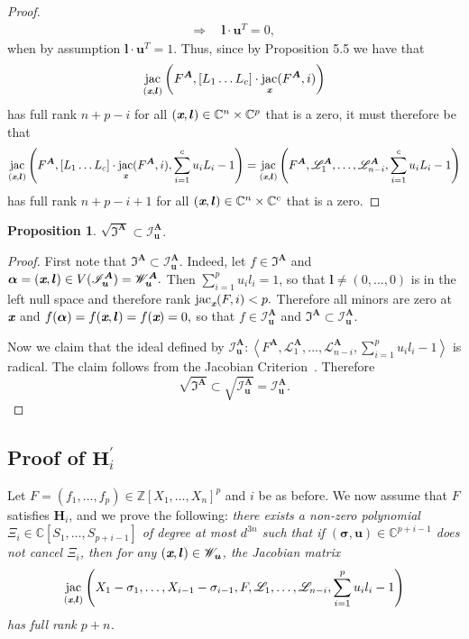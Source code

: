 \documentclass[a4paper]{article}
\def\sL{\mathscr{L}}
\def\sLA{\mathscr{L}^{\mA}}
\def\mA{{\bm A}}
\def\ub{{\bm u}}
\def\lb{{\bm l}}
\def\xb{\textit{\textbf{x}}}
\DeclareMathOperator{\jac}{jac}
\newcommand{\ZZ}{{\mathbb{Z}}}
\def\C{\mathbb{C}}
\def\IA{\mathfrak{I}^{\mA}}
\def\IAr{\sqrt{\mathfrak{I}^{\mA}}}
\def\IlA{\mathscr{I}_{\ub}^{\mA}}
\def\Wl{\mathscr{W}_{\ub}}
\def\WlA{\mathscr{W}_{\ub}^{\mA}}
\def\udl{\sum_{i=1}^pu_il_i}
\newtheorem{prop}[theorem]{Proposition}
\begin{document}
\begin{proof}
\begin{align*}
        \Rightarrow
        ~&~\lb \cdot \ub^T = 0,
    \end{align*}
    when by assumption $\lb \cdot \ub^T = 1.$ Thus, since by Proposition 5.5 we have that
    \[
   \jac_{(\xb,\lb)} \left(F^{\mA},[L_1 \hdots L_c] \cdot \jac_{\xb} (F^{\mA}, i)\right)
    \]
    has full rank $n+p-i$ for all $(\xb, \bm l) \in \C^n \times \C^p$ that is a zero, it must therefore be that 
    \[
    \jac_{(\xb,\lb)} \left(F^{\mA},[L_1 \hdots L_c] \cdot \jac_{\xb} (F^{\mA}, i),\sum_{i=1}^c u_iL_i-1\right)
    =
        \jac_{(\xb,\lb)} \left(F^{\mA},\sLA_1,\hdots,\sLA_{n-i},\sum_{i=1}^c u_iL_i-1\right)
    \]
    has full rank $n+p-i+1$ for all $(\xb, \bm l) \in \C^n \times \C^c$ that is a zero.
    \end{proof}
    \begin{prop}
    $
    \IAr \subset \IlA. 
    $
    \end{prop}
    \begin{proof}
    First note that $\IA \subset \IlA.$ Indeed, let $f \in \IA$ and $\bm \alpha = (\xb,\lb) \in V(\IlA)=\WlA.$ Then $\sum_{i=1}^p u_i l_i = 1$, so that $\lb \not = (0,\hdots,0)$ is in the left null space and therefore rank $\jac_{\xb} (F,i) < p.$ Therefore all minors are zero at $\xb$ and $f(\bm \alpha)= f(\xb,\lb)=f(\xb)=0,$ so that $f \in \IlA$ and $\IA \subset \IlA.$
    \par 
    Now we claim that the ideal defined by $\IlA:\left\langle F^{\mA},\sLA_1,\hdots,\sLA_{n-i},\udl-1 \right\rangle$ is radical. The claim follows from the Jacobian Criterion~\cite[Corollary 16.20]{ECA}. Therefore 
    \[
    \IAr \subset \sqrt{\IlA} = \IlA.
    \]
    \end{proof}




\subsection{Proof of $\textbf{H}_i^{'}$}\label{ssec:fiber}
Let $F = (f_1,\hdots,f_p) \in \ZZ[X_1,\hdots,X_n]^p$ and $i$ be as before. We now assume
that $F$ satisfies $\textbf{H}_i$, and we prove the following: {\em
  there exists a non-zero polynomial $\Xi_{i} \in
  \C[S_1,\dots,S_{p+i-1}]$ of degree at most $d^{3n}$ such that if $
  (\bm \sigma,\ub) \in \C^{p+i-1}$ does not cancel
  $\Xi_{i}$, then for any $(\xb,\lb) \in \Wl$, the Jacobian matrix
  $$\jac_{(\xb,\lb)}\left(X_1-\sigma_1,\dots,X_{i-1}-\sigma_{i-1},F,\sL_1,\hdots,\sL_{n-i},\udl-1\right)$$ has full rank $p+n$.}
\end{document}
